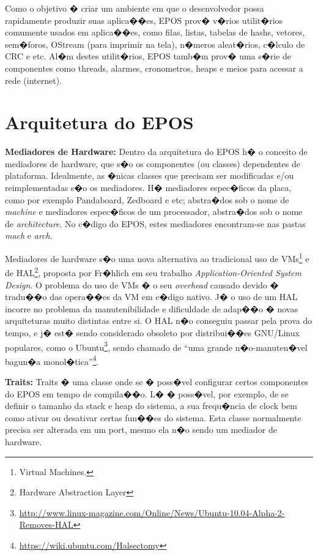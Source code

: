 \documentclass{ufscThesis/ufscThesis} %
\begin{document}
Como o objetivo � criar um ambiente em que o desenvolvedor possa rapidamente produzir suas aplica��es, EPOS prov� v�rios utilit�rios comumente usados em aplica��es, como filas, listas, tabelas de hashs, vetores, sem�foros, OStream (para imprimir na tela), n�meros aleat�rios, c�lculo de CRC e etc. Al�m destes utilit�rios, EPOS tamb�m prov� uma s�rie de componentes como threads, alarmes, cronometros, heaps e meios para acessar a rede (internet).

\section{Arquitetura do EPOS}

\textbf{Mediadores de Hardware:} Dentro da arquitetura do EPOS h� o conceito de mediadores de hardware, que s�o os componentes (ou classes) dependentes de plataforma. Idealmente, as �nicas classes que precisam ser modificadas e/ou reimplementadas s�o os mediadores. H� mediadores espec�ficos da placa, como por exemplo Pandaboard, Zedboard e etc; abstra�dos sob o nome de \emph{machine} e mediadores espec�ficos de um processador, abstra�dos sob o nome de \emph{architecture}. No c�digo do EPOS, estes mediadores encontram-se nas pastas \emph{mach} e \emph{arch}.

Mediadores de hardware s�o uma nova alternativa ao tradicional uso de VMs\footnote{Virtual Machines.} e de HAL\footnote{Hardware Abstraction Layer}, proposta por Fr�hlich em seu trabalho \emph{Application-Oriented System Design}\cite{guto_thesis}. O problema do uso de VMs � o seu \emph{overhead} causado devido � tradu��o das opera��es da VM em c�digo nativo. J� o uso de um HAL incorre no problema da manutenibilidade e dificuldade de adap��o � novas arquiteturas muito distintas entre si\cite{hw_mediators}. O HAL n�o conseguiu passar pela prova do tempo, e j� est� sendo considerado obsoleto por distribui��es GNU/Linux populares, como o 
Ubuntu\footnote{\url{http://www.linux-magazine.com/Online/News/Ubuntu-10.04-Alpha-2-Removes-HAL}}, sendo chamado de ``uma grande n�o-manuten�vel bagun�a monol�tica''\footnote{\url{https://wiki.ubuntu.com/Halsectomy}}.



\textbf{Traits:} Traits � uma classe onde se � poss�vel configurar certos componentes do EPOS em tempo de compila��o. L� � poss�vel, por exemplo, de se definir o tamanho da stack e heap do sistema, a sua frequ�ncia de clock bem como ativar ou desativar certas fun��es do sistema. Esta classe normalmente precisa ser alterada em um port, mesmo ela n�o sendo um mediador de hardware.
\end{document}
